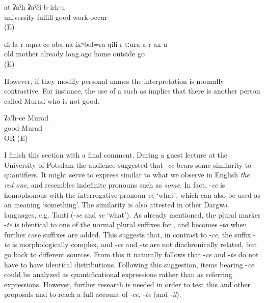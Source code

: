 \begin{exe}
	\ex	\label{ex:You who has finished the university will get a good job minor}
		at	ʡaˁħ	ʡaˁči	b-irk-u\\
		university	fulfill		good	work	occur\\
	\glt	{} (E)
	
	\ex	\label{ex:My old mother already since long ago does not leave the house minor}
	\gll	di-la	r-uqna-ce	aba	na	ixʷbel=ra	qili-r	tːura	a-r-ax-u\\
			old	mother	already	long.ago	home	outside	go\\
	\glt	{} (E)
\end{exe}

However, if they modify personal names the interpretation is normally contrastive. For instance, the use of a  such as  implies that there is another person called Murad who is not good.

\begin{exe}
	\ex	\label{ex:the good Murad minor}
	\gll	ʡaˁħ-ce	Murad\\
		good	Murad\\
	\glt	{} OR  (E)
\end{exe}


I finish this section with a final comment. During a guest lecture at the University of Potsdam the audience suggested that -\textit{ce} bears some similarity to quantifiers. It might serve to express  similar to what we observe in English \textit{the red one}, and resembles indefinite pronouns such as \textit{some}. In fact, -\textit{ce} is homophonous with the interrogative pronoun \textit{ce} `what', which can also be used as an  meaning `something'. The similarity is also attested in other Dargwa languages, e.g. Tanti (-\textit{se} and \textit{se} `what'). As already mentioned, the plural marker -\textit{te} is identical to one of the normal plural suffixes for , and becomes -\textit{ta} when further case suffixes are added. This suggests that, in contrast to -\textit{ce}, the suffix -\textit{te} is morphologically complex, and -\textit{ce} and -\textit{te} are not diachronically related, but go back to different sources. From this it naturally follows that -\textit{ce} and -\textit{te} do not have to have identical distributions. Following this suggestion, items bearing -\textit{ce} could be analyzed as quantificational expressions rather than as referring expressions. However, further research is needed in order to test this and other proposals and to reach a full account of -\textit{ce}, -\textit{te} (and -\textit{il}).


